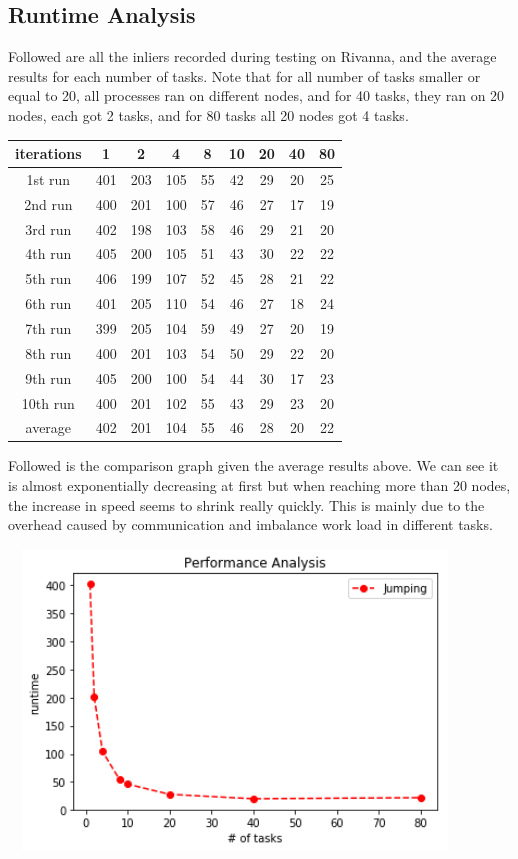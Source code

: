 \documentclass{cs4444}
\begin{document}
\subsection{Runtime Analysis}
	Followed are all the inliers recorded during testing on Rivanna, and the average results for each number of tasks. Note that for all number of tasks smaller or equal to 20, all processes ran on different nodes, and for 40 tasks, they ran on 20 nodes, each got 2 tasks, and for 80 tasks all 20 nodes got 4 tasks.
\begin{center}
\begin{tabular}{ |c|c|c|c|c|c|c|c|c| }
\hline
iterations & 1 & 2 & 4 & 8 & 10 & 20 & 40 & 80 \\
\hline
 1st run & 401 & 203 & 105 & 55 & 42 & 29 & 20 & 25  \\ 
 2nd run & 400 & 201 & 100 & 57 & 46 & 27 & 17 & 19  \\ 
 3rd run & 402 & 198 & 103 & 58 & 46 & 29 & 21 & 20  \\
 4th run & 405 & 200 & 105 & 51 & 43 & 30 & 22 & 22  \\
 5th run & 406 & 199 & 107 & 52 & 45 & 28 & 21 & 22  \\
 6th run & 401 & 205 & 110 & 54 & 46 & 27 & 18 & 24  \\
 7th run & 399 & 205 & 104 & 59 & 49 & 27 & 20 & 19  \\
 8th run & 400 & 201 & 103 & 54 & 50 & 29 & 22 & 20  \\
 9th run & 405 & 200 & 100 & 54 & 44 & 30 & 17 & 23 \\
 10th run & 400 & 201 & 102 & 55 & 43 & 29 & 23 & 20 \\
 \hline
 average & 402 & 201 & 104 & 55 & 46 & 28 & 20 & 22  \\
 \hline
\end{tabular}
\end{center}
Followed is the comparison graph given the average results above. We can see it is almost exponentially decreasing at first but when reaching more than 20 nodes, the increase in speed seems to shrink really quickly. This is mainly due to the overhead caused by communication and imbalance work load in different tasks.
\begin{center}
\includegraphics[width=12cm, height=8cm]{jumping}
\end{center}
\end{document}
